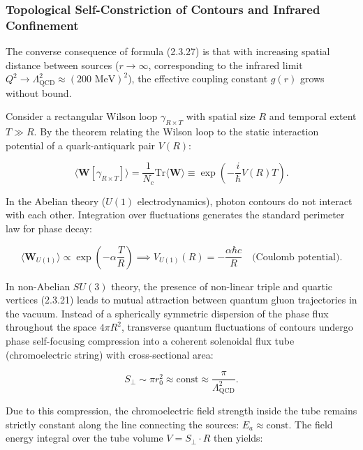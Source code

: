 \documentclass[11pt,a4paper]{article}
\theoremstyle{definition}
\begin{document}
\subsubsection{Topological Self-Constriction of Contours and Infrared Confinement}\label{sec:2.3.5}

The converse consequence of formula (2.3.27) is that with increasing spatial distance between sources ($r \to \infty$, corresponding to the infrared limit $Q^2 \to \Lambda_{\text{QCD}}^2 \approx (200\text{ MeV})^2$), the effective coupling constant $g(r)$ grows without bound.

Consider a rectangular Wilson loop $\gamma_{R \times T}$ with spatial size $R$ and temporal extent $T \gg R$. By the theorem relating the Wilson loop to the static interaction potential of a quark-antiquark pair $V(R)$:

\begin{equation}\label{eq:2.3.28}\tag{2.3.28}
\langle \mathbf{W}[\gamma_{R \times T}] \rangle = \frac{1}{N_c} \text{Tr}\langle \mathbf{W} \rangle \equiv \exp\left( - \frac{i}{\hbar} V(R) T \right).
\end{equation}

In the Abelian theory ($U(1)$ electrodynamics), photon contours do not interact with each other. Integration over fluctuations generates the standard perimeter law for phase decay:

\begin{equation}\label{eq:2.3.29}\tag{2.3.29}
\langle \mathbf{W}_{U(1)} \rangle \propto \exp\left( - \alpha \frac{T}{R} \right) \implies V_{U(1)}(R) = - \frac{\alpha \hbar c}{R} \quad \text{(Coulomb potential)}.
\end{equation}

In non-Abelian $SU(3)$ theory, the presence of non-linear triple and quartic vertices (2.3.21) leads to mutual attraction between quantum gluon trajectories in the vacuum. Instead of a spherically symmetric dispersion of the phase flux throughout the space $4\pi R^2$, transverse quantum fluctuations of contours undergo phase self-focusing compression into a coherent solenoidal flux tube (chromoelectric string) with cross-sectional area:

\begin{equation}\label{eq:2.3.30}\tag{2.3.30}
S_\perp \sim \pi r_0^2 \approx \text{const} \approx \frac{\pi}{\Lambda_{\text{QCD}}^2}.
\end{equation}

Due to this compression, the chromoelectric field strength inside the tube remains strictly constant along the line connecting the sources: $E_a \approx \text{const}$. The field energy integral over the tube volume $V = S_\perp \cdot R$ then yields:
\end{document}
